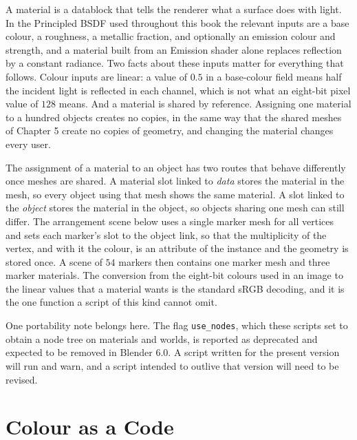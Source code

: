 A material is a datablock that tells the renderer what a surface does with light. In the Principled BSDF used throughout this book the relevant inputs are a base colour, a roughness, a metallic fraction, and optionally an emission colour and strength, and a material built from an Emission shader alone replaces reflection by a constant radiance. Two facts about these inputs matter for everything that follows. Colour inputs are linear: a value of $0.5$ in a base-colour field means half the incident light is reflected in each channel, which is not what an eight-bit pixel value of $128$ means. And a material is shared by reference. Assigning one material to a hundred objects creates no copies, in the same way that the shared meshes of Chapter 5 create no copies of geometry, and changing the material changes every user.

The assignment of a material to an object has two routes that behave differently once meshes are shared. A material slot linked to \emph{data} stores the material in the mesh, so every object using that mesh shows the same material. A slot linked to the \emph{object} stores the material in the object, so objects sharing one mesh can still differ. The arrangement scene below uses a single marker mesh for all vertices and sets each marker's slot to the object link, so that the multiplicity of the vertex, and with it the colour, is an attribute of the instance and the geometry is stored once. A scene of $54$ markers then contains one marker mesh and three marker materials. The conversion from the eight-bit colours used in an image to the linear values that a material wants is the standard sRGB decoding, and it is the one function a script of this kind cannot omit.



One portability note belongs here. The flag \texttt{use\_nodes}, which these scripts set to obtain a node tree on materials and worlds, is reported as deprecated and expected to be removed in Blender $6.0$. A script written for the present version will run and warn, and a script intended to outlive that version will need to be revised.

\section{Colour as a Code}

